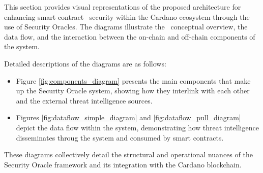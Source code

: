\documentclass{scrreport}
\begin{document}
This section provides visual representations of the proposed architecture for enhancing smart contract \
security within the Cardano ecosystem through the use of Security Oracles. The diagrams illustrate the \
conceptual overview, the data flow, and the interaction between the on-chain and off-chain components of the system. \newline \newline

Detailed descriptions of the diagrams are as follows:

\begin{itemize}
    \item Figure \ref{fig:components_diagram} presents the main components that make up the Security Oracle system, showing how they interlink with each other and the external threat intelligence sources.
    \item Figures \ref{fig:dataflow_simple_diagram} and \ref{fig:dataflow_pull_diagram} depict the data flow within the system, demonstrating how threat intelligence disseminates throug the system and consumed by smart contracts.
\end{itemize}

These diagrams collectively detail the structural and operational nuances of the Security Oracle framework and its integration with the Cardano blockchain.
\end{document}
